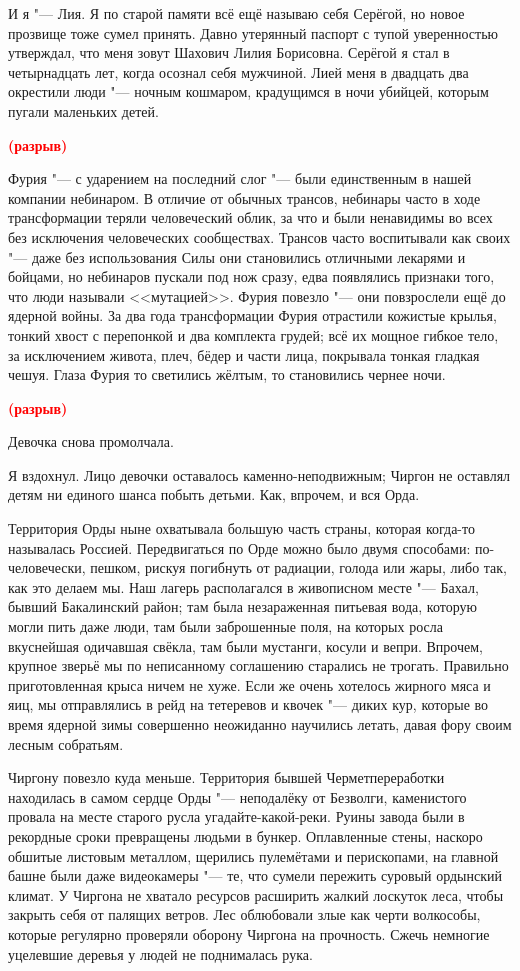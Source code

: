 \documentclass[a4paper,10pt,fleqn]{book}
\newcommand{\spacing}{\textcolor{red}{\textbf{(разрыв)}}}
\begin{document}
И я "--- Лия.
Я по старой памяти всё ещё называю себя Серёгой, но новое прозвище тоже сумел принять.
Давно утерянный паспорт с тупой уверенностью утверждал, что меня зовут Шахович Лилия Борисовна.
Серёгой я стал в четырнадцать лет, когда осознал себя мужчиной.
Лией меня в двадцать два окрестили люди "--- ночным кошмаром, крадущимся в ночи убийцей, которым пугали маленьких детей.

\spacing

Фурия "--- с ударением на последний слог "--- были единственным в нашей компании небинаром.
В отличие от обычных трансов, небинары часто в ходе трансформации теряли человеческий облик, за что и были ненавидимы во всех без исключения человеческих сообществах.
Трансов часто воспитывали как своих "--- даже без использования Силы они становились отличными лекарями и бойцами, но небинаров пускали под нож сразу, едва появлялись признаки того, что люди называли <<мутацией>>.
Фурия повезло "--- они повзрослели ещё до ядерной войны.
За два года трансформации Фурия отрастили кожистые крылья, тонкий хвост с перепонкой и два комплекта грудей;
всё их мощное гибкое тело, за исключением живота, плеч, бёдер и части лица, покрывала тонкая гладкая чешуя.
Глаза Фурия то светились жёлтым, то становились чернее ночи.

\spacing

Девочка снова промолчала.

Я вздохнул.
Лицо девочки оставалось каменно-неподвижным;
Чиргон не оставлял детям ни единого шанса побыть детьми.
Как, впрочем, и вся Орда.

Территория Орды ныне охватывала большую часть страны, которая когда-то называлась Россией.
Передвигаться по Орде можно было двумя способами: по-человечески, пешком, рискуя погибнуть от радиации, голода или жары, либо так, как это делаем мы.
Наш лагерь располагался в живописном месте "--- Бахал, бывший Бакалинский район;
там была незараженная питьевая вода, которую могли пить даже люди, там были заброшенные поля, на которых росла вкуснейшая одичавшая свёкла, там были мустанги, косули и вепри.
Впрочем, крупное зверьё мы по неписанному соглашению старались не трогать.
Правильно приготовленная крыса ничем не хуже.
Если же очень хотелось жирного мяса и яиц, мы отправлялись в рейд на тетеревов и квочек "--- диких кур, которые во время ядерной зимы совершенно неожиданно научились летать, давая фору своим лесным собратьям.

Чиргону повезло куда меньше.
Территория бывшей Черметпереработки находилась в самом сердце Орды "--- неподалёку от Безволги, каменистого провала на месте старого русла угадайте-какой-реки.
Руины завода были в рекордные сроки превращены людьми в бункер.
Оплавленные стены, наскоро обшитые листовым металлом, щерились пулемётами и перископами, на главной башне были даже видеокамеры "--- те, что сумели пережить суровый ордынский климат.
У Чиргона не хватало ресурсов расширить жалкий лоскуток леса, чтобы закрыть себя от палящих ветров.
Лес облюбовали злые как черти волкособы, которые регулярно проверяли оборону Чиргона на прочность.
Сжечь немногие уцелевшие деревья у людей не поднималась рука.
\end{document}
